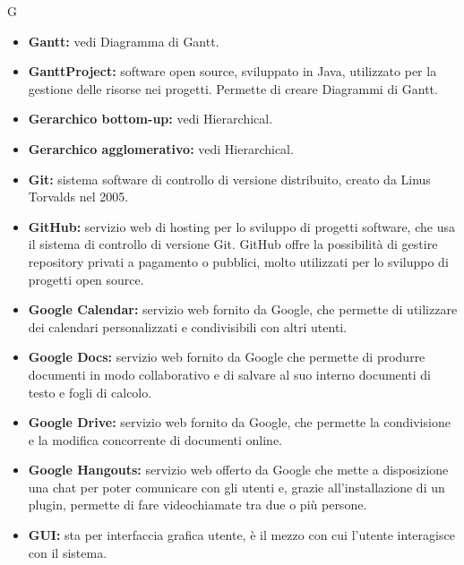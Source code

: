 \Huge G
\normalsize
\begin{itemize}
\item\textbf{Gantt:} vedi Diagramma di Gantt\glossario{}.

\item\textbf{GanttProject:} software open source, sviluppato in Java, utilizzato per la gestione delle risorse nei progetti. Permette di creare Diagrammi di Gantt\glossario{}.

\item\textbf{Gerarchico bottom-up:} vedi Hierarchical\glossario{}.

\item\textbf{Gerarchico agglomerativo:} vedi Hierarchical\glossario{}.

\item \textbf{Git:} sistema software di controllo di versione distribuito, creato da Linus Torvalds nel 2005.

\item \textbf{GitHub:} servizio web di hosting per lo sviluppo di progetti software, che usa il sistema di controllo di versione Git\glossario{}. GitHub\glossario{} offre la possibilità di gestire repository\glossario{} privati a pagamento o pubblici, molto utilizzati per lo sviluppo di progetti open source.

\item \textbf{Google Calendar:} servizio web fornito da Google, che permette di utilizzare dei calendari personalizzati e condivisibili con altri utenti.

\item \textbf{Google Docs:} servizio web fornito da Google che permette di produrre documenti in modo collaborativo e di salvare al suo interno documenti di testo e fogli di calcolo.

\item \textbf{Google Drive:} servizio web fornito da Google, che permette la condivisione e la modifica concorrente di documenti online.

\item \textbf{Google Hangouts:} servizio web offerto da Google che mette a disposizione una chat per poter comunicare con gli utenti e, grazie all'installazione di un plugin, permette di fare videochiamate tra due o più persone.

\item \textbf{GUI:} sta per interfaccia grafica utente, è il mezzo con cui l'utente interagisce con il sistema.
\end{itemize}
\pagebreak


